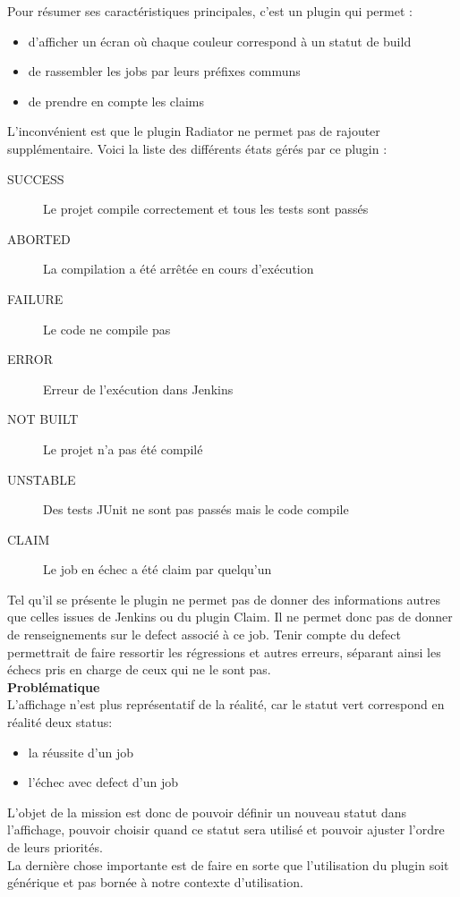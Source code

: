 Pour résumer ses caractéristiques principales, c'est un plugin qui permet :
\begin{itemize}
	\item d'afficher un écran  où chaque couleur correspond à un statut de build
	\item de rassembler les jobs par leurs préfixes communs
	\item de prendre en compte les claims
\end{itemize}

L'inconvénient est que le plugin Radiator ne permet pas de rajouter supplémentaire. Voici la liste des différents états gérés par ce plugin : 
\begin{description}
	\item[SUCCESS] Le projet compile correctement et tous les tests sont passés
	\item[ABORTED] La compilation a été arrêtée en cours d'exécution
	\item[FAILURE] Le code ne compile pas
	\item[ERROR] Erreur de l'exécution dans Jenkins
	\item[NOT BUILT] Le projet n'a pas été compilé
	\item[UNSTABLE] Des tests JUnit ne sont pas passés mais le code compile
	\item[CLAIM] Le job en échec a été claim par quelqu'un
\end{description}



Tel qu'il se présente le plugin ne permet pas de donner des informations autres que celles issues de Jenkins ou du plugin Claim. Il ne permet donc pas de donner de renseignements sur le defect associé à ce job. Tenir compte du defect permettrait de faire ressortir les régressions et autres erreurs, séparant ainsi les échecs pris en charge de ceux qui ne le sont pas.\\

\textbf{Problématique}\hfill \\ \indent
L'affichage n'est plus représentatif de la réalité, car le statut vert correspond en réalité deux status:
\begin{itemize}
	\item la réussite d'un job
	\item l'échec avec defect d'un job 
\end{itemize}

L'objet de la mission est donc de pouvoir définir un nouveau statut dans l'affichage, pouvoir choisir quand ce statut sera utilisé et pouvoir ajuster l'ordre de leurs priorités.\\
La dernière chose importante est de faire en sorte que l'utilisation du plugin soit générique et pas bornée à notre contexte d'utilisation.




